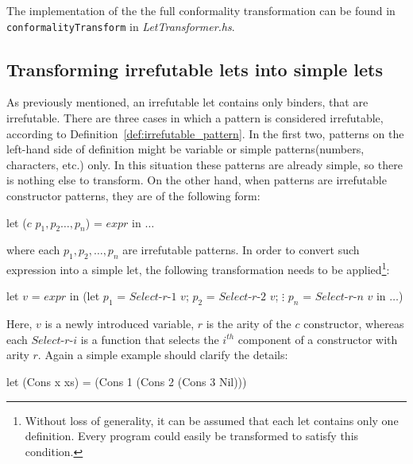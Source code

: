 \documentclass[12pt,a4paper]{report}
\begin{document}
The implementation of the the full conformality transformation can be found in
\texttt{conformalityTransform} in \textit{LetTransformer.hs}.

\subsection{Transforming irrefutable lets into simple lets}
As previously mentioned, an irrefutable let contains only binders, that are
irrefutable. There are three cases in which a pattern is considered
irrefutable, according to Definition~\ref{def:irrefutable_pattern}. In the
first two, patterns on the left-hand side of definition might be variable or
simple patterns(numbers, characters, etc.) only. In this situation these
patterns are already simple, so there is nothing else to transform. On the
other hand, when patterns are irrefutable constructor patterns, they are of the
following form:

\vspace*{0.2in}
\begin{code}[style=haskell,mathescape=true]
  let ($c$ $p_1, p_2 \ldots, p_n$) = $expr$ in $\ldots$
\end{code}

where each $p_1, p_2, \ldots, p_n$ are irrefutable patterns. In order to
convert such expression into a simple let, the following transformation needs
to be applied\footnote{Without loss of generality, it can be assumed that each
let contains only one definition. Every program could easily be transformed to
satisfy this condition.}:

\vspace*{0.2in}
\begin{code}[style=haskell,mathescape=true]
  let $v$ = $expr$
  in (let $p_1$ = $Select\mbox{-}r\mbox{-}1$ $v$;
          $p_2$ = $Select\mbox{-}r\mbox{-}2$ $v$;
                $\vdots$
          $p_n$ = $Select\mbox{-}r\mbox{-}n$ $v$
      in $\ldots$)
\end{code}

Here, $v$ is a newly introduced variable, $r$ is the arity of the $c$
constructor, whereas each $Select\mbox{-}r\mbox{-}i$ is a function that selects
the $i^{th}$ component of a constructor with arity $r$. Again a simple example
should clarify the details:

\vspace*{0.2in}
\begin{code}[style=haskell,mathescape=true]
  let (Cons x xs) = (Cons 1 (Cons 2 (Cons 3 Nil)))
\end{code}
\end{document}
